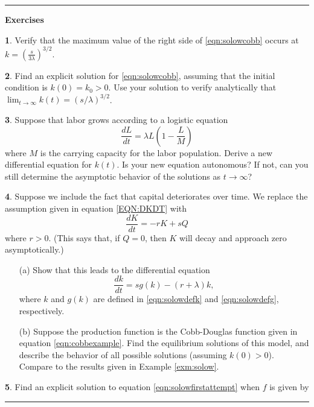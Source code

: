 \documentclass[reqno]{immbook}
\numberwithin{equation}{chapter}
\numberwithin{question}{section}
\numberwithin{theorem}{chapter}
\numberwithin{figure}{chapter}
\theoremstyle{definition}
\newtheorem{exercise}{}[section]
\newenvironment{exercises}%
{%
\medskip\hrule\medskip\noindent\textbf{Exercises}%
}%
{%
\medskip\hrule
}
\begin{document}
%
\begin{exercises}
\begin{exercise}
Verify that the maximum value of the right side
of \eqref{eqn:solowcobb} occurs
at $k=\left(\frac{s}{3\lambda}\right)^{3/2}$.
\end{exercise}
\begin{exercise}
Find an explicit solution for \eqref{eqn:solowcobb},
assuming that the initial condition is $k(0)=k_0 > 0$.
Use your solution to verify analytically that
$\lim_{t\rightarrow\infty} k(t) = \left(s/\lambda\right)^{3/2}$.
\end{exercise}
\begin{exercise}
Suppose that labor grows according to a logistic equation
\begin{equation}
  \frac{dL}{dt} = \lambda L \left(1-\frac{L}{M}\right)
\end{equation}
where $M$ is the carrying capacity for the labor population.
Derive a new differential equation for $k(t)$.
Is your new equation autonomous?
If not, can you still determine the asymptotic
behavior of the solutions as $t\rightarrow\infty$?
\end{exercise}
\begin{exercise}
Suppose we include the fact that capital deteriorates
over time.  We replace the assumption given
in equation \eqref{EQN:DKDT} with
\begin{equation}
   \frac{dK}{dt} = -rK + sQ
\end{equation}
where $r > 0$.
(This says that, if $Q=0$, then $K$ will decay and
approach zero asymptotically.)
\begin{enumerate}
\item[(a)]
Show that this leads to the differential equation
\begin{equation}
   \frac{dk}{dt} = s g(k) - (r+\lambda) k,
\end{equation}
where $k$ and $g(k)$ are defined
in \eqref{eqn:solowdefk} and \eqref{eqn:solowdefg}, 
respectively.
\item[(b)]
Suppose the production function is the Cobb-Douglas function
given in equation \eqref{eqn:cobbexample}.
Find the equilibrium solutions of this model, 
and describe the behavior of all possible solutions
(assuming $k(0)>0$).
Compare to the results given in Example \ref{exm:solow}.
\end{enumerate}
\end{exercise}
\begin{exercise}
Find an explicit solution to equation
\eqref{eqn:solowfirstattempt} when $f$ is given by

\end{exercise}
\end{exercises}
\end{document}
